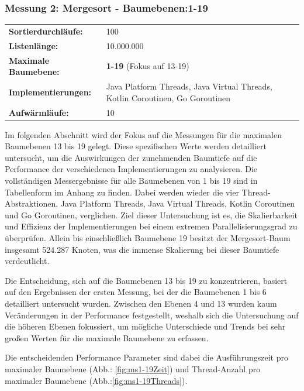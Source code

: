 \documentclass[fontsize=12pt,paper=a4,twoside=semi,parskip=half-,headsepline,headinclude]{scrreprt}
\begin{document}
\subsubsection{Messung 2: Mergesort - Baumebenen:1-19}

\begin{tabularx}{\textwidth}{@{}lX@{}}
	\textbf{Sortierdurchläufe:} & 100 \\
	\textbf{Listenlänge:} & 10.000.000 \\
	\textbf{Maximale Baumebene:} & \textbf{1-19} (Fokus auf 13-19) \\
	\textbf{Implementierungen:} & Java Platform Threads, Java Virtual Threads, Kotlin Coroutinen, Go Goroutinen \\
	\textbf{Aufwärmläufe:} & 10
\end{tabularx}

Im folgenden Abschnitt wird der Fokus auf die Messungen für die maximalen Baum\-ebenen 13 bis 19 gelegt. Diese spezifischen Werte werden detailliert untersucht, um die Auswirkungen der zunehmenden Baumtiefe auf die Performance der verschiedenen Implementierungen zu analysieren. Die vollständigen Messergebnisse für alle  Baumebenen von 1 bis 19 sind in Tabellenform im Anhang zu finden. Dabei werden wieder die vier Thread-Abstraktionen, Java Platform Threads, Java Virtual Threads, Kotlin Coroutinen und Go Goroutinen, verglichen. Ziel dieser Untersuchung ist es, die Skalierbarkeit und Effizienz der Implementierungen bei einem extremen Parallelisierungsgrad zu überprüfen. Allein bis einschließlich Baumebene 19 besitzt der Mergesort-Baum insgesamt 524.287 Knoten, was die immense Skalierung bei dieser Baumtiefe verdeutlicht.

Die Entscheidung, sich auf die Baumebenen 13 bis 19 zu konzentrieren, basiert auf den Ergebnissen der ersten Messung, bei der die Baumebenen 1 bis 6 detailliert untersucht wurden. Zwischen den Ebenen 4 und 13 wurden kaum Veränderungen in der Performance festgestellt, weshalb sich die Untersuchung auf die höheren Ebenen  fokussiert, um mögliche Unterschiede und Trends bei sehr großen Werten für die maximale Baumebene zu erfassen.

Die entscheidenden Performance Parameter sind dabei die Ausführungszeit pro maximaler Baumebene (Abb.: \ref{fig:ms1-19Zeit}) und Thread-Anzahl pro maximaler Baumebene (Abb.:\ref{fig:ms1-19Threads}).
\end{document}
